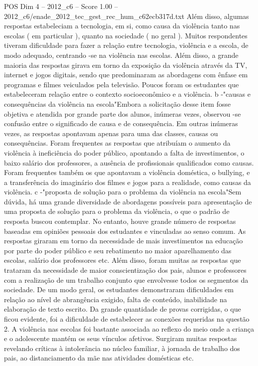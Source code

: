 \begin{textsample}{POS Dim 4 – 2012\_c6 – Score 1.00 – 2012\_c6/enade\_2012\_tec\_gest\_rec\_hum\_c62ecb317d.txt}
Além disso, algumas respostas estabeleciam a tecnologia, em si, como causa da violência tanto nas escolas ( em particular ), quanto na sociedade ( no geral ).
Muitos respondentes tiveram dificuldade para fazer a relação entre tecnologia, violência e a escola, de modo adequado, centrando -se na violência nas escolas.
Além disso, a grande maioria das respostas girava em torno da exposição da violência através da TV, internet e jogos digitais, sendo que predominaram as abordagens com ênfase em programas e filmes veiculados pela televisão.
Poucos foram os estudantes que estabeleceram relação entre o contexto socioeconômico e a violência. b -"causas e consequências da violência na escola"Embora a solicitação desse item fosse objetiva e atendida por grande parte dos alunos, inúmeras vezes, observou -se confusão entre o significado de causa e de consequência.
Em outras inúmeras vezes, as respostas apontavam apenas para uma das classes, causas ou consequências.
Foram frequentes as respostas que atribuíam o aumento da violência à ineficiência do poder público, apontando a falta de investimentos, o baixo salário dos professores, a ausência de profissionais qualificados como causas.
Foram frequentes também os que apontavam a violência doméstica, o bullying, e a transferência do imaginário dos filmes e jogos para a realidade, como causas da violência. c -"proposta de solução para o problema da violência na escola"Sem dúvida, há uma grande diversidade de abordagens possíveis para apresentação de uma proposta de solução para o problema da violência, o que o padrão de resposta buscou contemplar.
No entanto, houve grande número de respostas baseadas em opiniões pessoais dos estudantes e vinculadas ao senso comum.
As respostas giraram em torno da necessidade de mais investimentos na educação por parte do poder público e seu rebatimento no maior aparelhamento das escolas, salário dos professores etc.
Além disso, foram muitas as respostas que trataram da necessidade de maior conscientização dos pais, alunos e professores com a realização de um trabalho conjunto que envolvesse todos os segmentos da sociedade.
De um modo geral, os estudantes demonstraram dificuldades em relação ao nível de abrangência exigido, falta de conteúdo, inabilidade na elaboração de texto escrito.
Da grande quantidade de provas corrigidas, o que ficou evidente, foi a dificuldade de estabelecer as conexões requeridas na questão 2.
A violência nas escolas foi bastante associada ao reflexo do meio onde a criança e o adolescente mantém os seus vínculos afetivos.
Surgiram muitas respostas revelando críticas à intolerância no núcleo familiar, à jornada de trabalho dos pais, ao distanciamento da mãe nas atividades domésticas etc.

\end{textsample}
